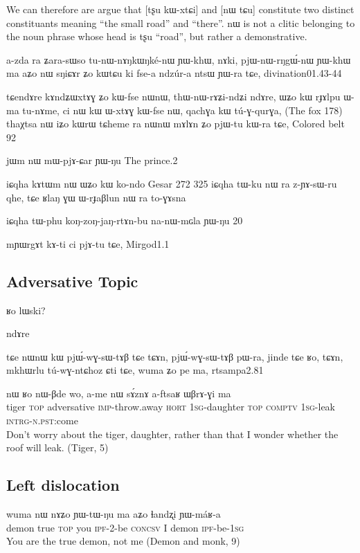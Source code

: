 \documentclass[oldfontcommands,oneside,a4paper,11pt]{memoir}
\newcommand{\ipa}[1]{{\phon #1}} %
\newcommand{\concsv}{\textsc{concsv}}
\newcommand{\comptv}{\textsc{comptv}} %
\newcommand{\hort}{\textsc{hort}}
\newcommand{\imp}{\textsc{imp}}
\newcommand{\intrg}{\textsc{intrg}}
\newcommand{\ipf}{\textsc{ipf}}
\newcommand{\npst}{\textsc{n.pst}}
\newcommand{\sg}{\textsc{sg}}
\newcommand{\topic}{\textsc{top}}
\begin{document}
We can therefore are argue that [\ipa{tʂu} \ipa{kɯ-xtɕi}] and [\ipa{nɯ} \ipa{tɕu}]  constitute two distinct constituants meaning ``the small road'' and ``there''. \ipa{nɯ} is not a clitic belonging to the noun phrase whose head is \ipa{tʂu} ``road'', but rather a demonstrative.
 


 
 a-zda ra ʑara-sɯso tu-nɯ-nɤŋkɯŋké-nɯ ɲɯ-khɯ, nɤki, pjɯ-nɯ-rŋgɯ́-nɯ ɲɯ-khɯ ma aʑo nɯ sŋiɕɤr ʑo kɯtɕu ki fse-a ndzúr-a ntsɯ ɲɯ-ra tɕe,
 divination01.43-44

tɕendɤre	kɤndʑɯxtɤɣ	ʑo	kɯ-fse	nɯnɯ,	thɯ-nɯ-rɤʑi-ndʑi	ndɤre,
ɯʑo	kɯ	rɟɤlpu	ɯ-ma	tu-nɤme,	ci	nɯ	kɯ	ɯ-xtɤɣ	kɯ-fse	nɯ,	qachɣa	kɯ	tú-ɣ-qurɣa,
(The fox 178) 
thaχtsa	nɯ	iʑo	kɯrɯ	tɕheme	ra	nɯnɯ	mɤlɤn	ʑo	pjɯ-tu	kɯ-ra	tɕe,
Colored belt 92

jɯm	nɯ	mɯ-pjɤ-ɕar	ɲɯ-ŋu
The prince.2



iɕqha	       kɤtɯm	nɯ	ɯʑo	kɯ	ko-ndo
Gesar 272
325	iɕqha	tɯ-ku	nɯ	ra	z-ɲɤ-sɯ-ru	qhe,	tɕe	ʁlaŋ	ɣɯ	ɯ-rɟaβlun	nɯ	ra	to-ɣɤsna
 

iɕqha	tɯ-phu	koŋ-zoŋ-jaŋ-rtɤn-bu	na-nɯ-mɢla	ɲɯ-ŋu	
20


mɲɯrgɤt kɤ-ti ci pjɤ-tu tɕe,
Mirgod1.1

\subsection{Adversative Topic}


ʁo lɯski?

ndɤre

 tɕe nɯnɯ kɯ pjɯ́-wɣ-sɯ-tɤβ tɕe tɕɤn,
 pjɯ́-wɣ-sɯ-tɤβ pɯ-ra, jinde tɕe ʁo, tɕɤn, 
 mkhɯrlu tú-wɣ-ntɕhoz ɕti tɕe, wuma ʑo pe ma,
rtsampa2.81 
 
\begin{exe}	
\ex	
\gll 	\ipa{khu} 	\ipa{nɯ} 	\ipa{ʁo} 	\ipa{nɯ-βde} 	\ipa{wo}, 	\ipa{a-me} 	\ipa{nɯ} 	\ipa{sɤ́znɤ} 	\ipa{a-ftsaʁ} 	\ipa{ɯβrɤ-ɣi} 	\ipa{ma} \\
tiger \topic{} adversative \imp{}-throw.away \hort{} 1\sg{}-daughter \topic{} \comptv{} 1\sg{}-leak  \intrg{}-\npst{}:come \question{} \\
 \glt 	Don't worry about the tiger, daughter, rather than that I wonder whether the roof will leak. (Tiger, 5)
\end{exe} 	



\subsection{Left dislocation}
\begin{exe}								
\ex								
\gll 	\ipa{ɬandʐi} 	\ipa{wuma} 	\ipa{nɯ} 	\ipa{nɤʑo} 	\ipa{ɲɯ-tɯ-ŋu} 	\ipa{ma} 	\ipa{aʑo} 	\ipa{ɬandʐi} \ipa{ɲɯ-máʁ-a}  \\
demon true \topic{} you \ipf{}-2-be \concsv{} I demon \ipf{}-be-1\sg{} \\
 \glt 	You are the true demon, not me (Demon and monk, 9)
\end{exe} 
\end{document}
